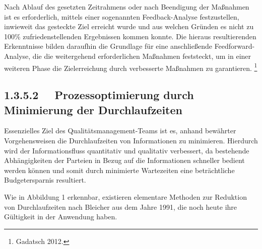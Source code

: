 \documentclass[a4paper]{article}
\begin{document}
\bigskip

{\sffamily
Nach Ablauf des gesetzten Zeitrahmens oder nach Beendigung der Maßnahmen ist es erforderlich, mittels einer sogenannten
Feedback-Analyse festzustellen, inwieweit das gesteckte Ziel erreicht wurde und aus welchen Gründen es nicht zu 100\%
zufriedenstellenden Ergebnissen kommen konnte. Die hieraus resultierenden Erkenntnisse bilden daraufhin die Grundlage
für eine anschließende Feedforward-Analyse, die die weitergehend erforderlichen Maßnahmen feststeckt, um in einer
weiteren Phase die Zielerreichung durch verbesserte Maßnahmen zu garantieren. \footnote{Gadatsch 2012.}}

\subsection[1.3.5.2 \ \ Prozessoptimierung durch Minimierung der Durchlaufzeiten]{1.3.5.2 \ \ Prozessoptimierung durch
Minimierung der Durchlaufzeiten}
{\sffamily
Essenzielles Ziel des Qualitätsmanagement-Teams ist es, anhand bewährter Vorgehensweisen die Durchlaufzeiten von
Informationen zu minimieren. Hierdurch wird der Informationsfluss quantitativ und qualitativ verbessert, da bestehende
Abhängigkeiten der Parteien in Bezug auf die Informationen schneller bedient werden können und somit durch minimierte
Wartezeiten eine beträchtliche Budgetersparnis resultiert. }


\bigskip


\bigskip


\bigskip

{\sffamily
Wie in Abbildung 1 erkennbar, existieren elementare Methoden zur Reduktion von Durchlaufzeiten nach Bleicher aus dem
Jahre 1991, die noch heute ihre Gültigkeit in der Anwendung haben. }
\end{document}
